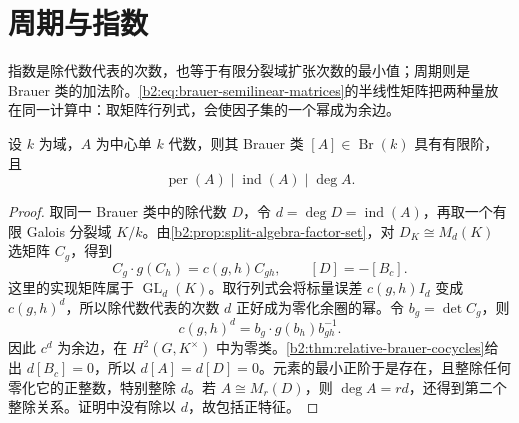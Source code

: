 %
%

\section{周期与指数}
\label{b2:sec:1805}

指数是除代数代表的次数，也等于有限分裂域扩张次数的最小值；周期则是 Brauer 类的加法阶。\eqref{b2:eq:brauer-semilinear-matrices}的半线性矩阵把两种量放在同一计算中：取矩阵行列式，会使因子集的一个幂成为余边。

\begin{theorem}\label{b2:thm:period-divides-index}
	设 \(k\) 为域，\(A\) 为中心单 \(k\) 代数，则其 Brauer 类 \([A]\in\operatorname{Br}(k)\) 具有有限阶，且
	\[
		\operatorname{per}(A)\mid\operatorname{ind}(A)\mid\deg A.
	\]
\end{theorem}
\begin{proof}
	取同一 Brauer 类中的除代数 \(D\)，令 \(d=\deg D=\operatorname{ind}(A)\)，再取一个有限 Galois 分裂域 \(K/k\)。由\cref{b2:prop:split-algebra-factor-set}，对 \(D_K\cong M_d(K)\) 选矩阵 \(C_g\)，得到
	\[
		C_g\cdot g(C_h)=c(g,h)C_{gh},\qquad [D]=-[B_c].
	\]
	这里的实现矩阵属于 \(\operatorname{GL}_d(K)\)。取行列式会将标量误差 \(c(g,h)I_d\) 变成 \(c(g,h)^d\)，所以除代数代表的次数 \(d\) 正好成为零化余圈的幂。令 \(b_g=\det C_g\)，则
	\[
		c(g,h)^d=b_g\cdot g(b_h)b_{gh}^{-1}.
	\]
	因此 \(c^d\) 为余边，在 \(H^2(G,K^\times)\) 中为零类。\cref{b2:thm:relative-brauer-cocycles}给出 \(d[B_c]=0\)，所以 \(d[A]=d[D]=0\)。元素的最小正阶于是存在，且整除任何零化它的正整数，特别整除 \(d\)。若 \(A\cong M_r(D)\)，则 \(\deg A=rd\)，还得到第二个整除关系。证明中没有除以 \(d\)，故包括正特征。
\end{proof}

